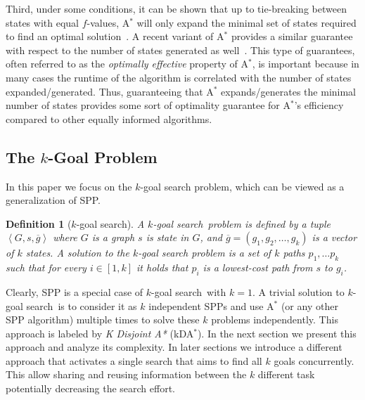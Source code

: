 \documentclass{aicom2e}
\newtheorem{definition}{Definition}
\newcommand{\kgs}{$k$-goal search}
\newcommand{\astar}{A$^*$}
\newcommand{\kxastar}{kDA$^*$}
\newcommand{\tuple}[1]{\ensuremath{\left \langle #1 \right \rangle }}
\begin{document}
Third, under some conditions, it can be shown that up to tie-breaking between
states with equal $f$-values, \astar{} will only expand the minimal set of
states required to find an optimal
solution~\cite{dechter1985generalizedBestFirst}. A recent variant of \astar{}
provides a similar guarantee with respect to the number of states generated as
well~\cite{goldenberg2014enhanced}. This type of guarantees, often referred to
as the {\em optimally effective} property of \astar{}, is  important because in
many cases the runtime of the algorithm is correlated with the number of states
expanded/generated. Thus, guaranteeing that \astar{} expands/generates the
minimal number of states provides some sort of optimality guarantee for
\astar{}'s efficiency compared to other equally informed algorithms.



\subsection{The $k$-Goal Problem}

In this paper we focus on the $k$-goal search problem, which can be viewed as a
generalization of SPP.



\begin{definition}[$k$-goal search]
    A \kgs\ problem is defined by a tuple $\tuple{G,s, \overline{g}}$
        where $G$ is a graph
        $s$ is state in $G$,
        and $\overline{g}=(g_1,g_2,\ldots,g_k)$ is a vector of $k$ states.
    A solution to the \kgs{} problem is a set of $k$ paths $p_1,\ldots p_k$ such that for every
    $i\in [1,k]$ it holds that $p_i$ is a lowest-cost path from $s$ to $g_i$.
\label{def:k-goal}
\end{definition}



Clearly, SPP is a special case of \kgs\ with $k=1$. A trivial solution to \kgs\
is to consider it as $k$ independent SPPs and use \astar{} (or any other SPP
algorithm) multiple times to solve these $k$ problems independently. This
approach is labeled by {\em K Disjoint A*} (\kxastar). In the next section we
present this approach and analyze its complexity. In later sections we
introduce a different approach that activates a single search that aims to find
all $k$ goals concurrently. This allow sharing and reusing information between
the $k$ different task potentially decreasing the search effort.
\end{document}
